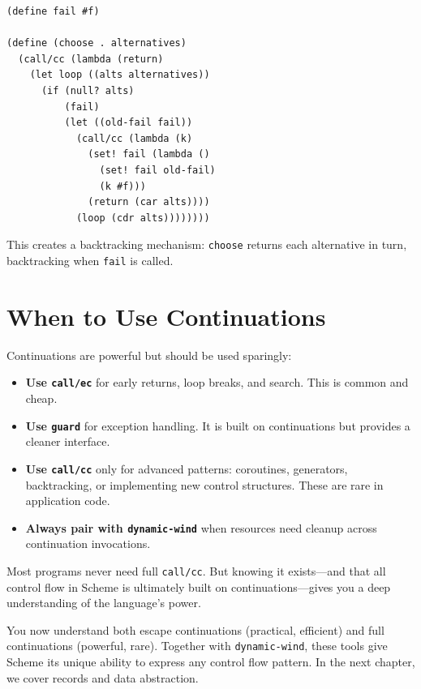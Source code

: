 \begin{lstlisting}
(define fail #f)

(define (choose . alternatives)
  (call/cc (lambda (return)
    (let loop ((alts alternatives))
      (if (null? alts)
          (fail)
          (let ((old-fail fail))
            (call/cc (lambda (k)
              (set! fail (lambda ()
                (set! fail old-fail)
                (k #f)))
              (return (car alts))))
            (loop (cdr alts))))))))
\end{lstlisting}

This creates a backtracking mechanism: \texttt{choose} returns each alternative in turn, backtracking when \texttt{fail} is called.

\section{When to Use Continuations}

Continuations are powerful but should be used sparingly:

\begin{itemize}
    \item \textbf{Use \texttt{call/ec}} for early returns, loop breaks, and search. This is common and cheap.
    \item \textbf{Use \texttt{guard}} for exception handling. It is built on continuations but provides a cleaner interface.
    \item \textbf{Use \texttt{call/cc}} only for advanced patterns: coroutines, generators, backtracking, or implementing new control structures. These are rare in application code.
    \item \textbf{Always pair with \texttt{dynamic-wind}} when resources need cleanup across continuation invocations.
\end{itemize}

Most programs never need full \texttt{call/cc}. But knowing it exists---and that all control flow in Scheme is ultimately built on continuations---gives you a deep understanding of the language's power.

\sectionbreak

You now understand both escape continuations (practical, efficient) and full continuations (powerful, rare). Together with \texttt{dynamic-wind}, these tools give Scheme its unique ability to express any control flow pattern. In the next chapter, we cover records and data abstraction.
